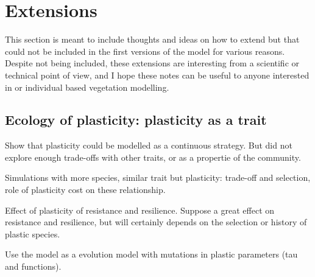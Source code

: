 
\chapter{Extensions}\label{chapter:extension}
\begin{fullwidth}
This section is meant to include thoughts and ideas on how to extend \model but that could not be included in the first versions of the model for various reasons. Despite not being included, these extensions are interesting from a scientific or technical point of view, and I hope these notes can be useful to anyone interested in \model or individual based vegetation modelling.
\end{fullwidth}

%
%

\section{Ecology of plasticity: plasticity as a trait}


Show that plasticity could be modelled as a continuous strategy. But did not explore enough trade-offs with other traits, or as a propertie of the community. 

Simulations with more species, similar trait but plasticity: trade-off and selection, role of plasticity cost on these relationship.

Effect of plasticity of resistance and resilience. Suppose a great effect on resistance and resilience, but will certainly depends on the selection or history of plastic species.

Use the model as a evolution model with mutations in plastic parameters (tau and functions).

